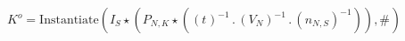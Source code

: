 \documentclass[border=1pt]{standalone}
\begin{document}
$K^o=\text{Instantiate}({I}{_{S}} \star \left({P}{_{N, K}} \star \left(\left( {t}{_{}} \right)^{-1} \, . \, \left( {V}{_{N}} \right)^{-1} \, . \, \left( {n}{_{N, S}} \right)^{-1}\right)\right), {{\#}}{_{}})$
\end{document}
